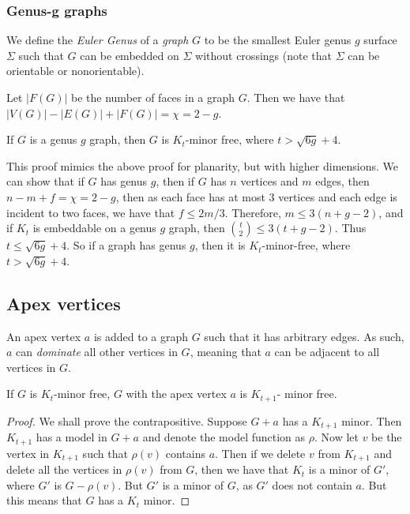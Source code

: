 \subsubsection{Genus-g graphs}\label{sssec:Graph_genus}

We define the \textit{Euler Genus} of a \textit{graph} $G$ to be the smallest Euler genus $g$ surface $\Sigma$ such that $G$ can be embedded on $\Sigma$ without crossings (note that $\Sigma$ can be orientable or nonorientable).

Let $|F(G)|$ be the number of faces in a graph $G$. Then we have that $|V(G)| - |E(G)| + |F(G)| = \chi = 2 - g$. 

\begin{theorem}\label{thm:bounded_genus_kt_free}
	If $G$ is a genus $g$ graph, then $G$ is $K_t$-minor free, where $t > \sqrt{6g} + 4$. 
\end{theorem}
This proof mimics the above proof for planarity, but with higher dimensions. 
We can show that if $G$ has genus $g$, then if $G$ has $n$ vertices and $m$ edges, then $n - m + f = \chi = 2-g$, then as each face has at most 3 vertices and each edge is incident to two faces, we have that $f \leq 2m/3$. Therefore, $m \leq 3(n + g - 2)$, and if $K_t$ is embeddable on a genus $g$ graph, then $\binom{t}{2} \leq 3 (t + g - 2)$. Thus $t \leq \sqrt{6g} + 4$. So if a graph has genus $g$, then it is $K_t$-minor-free, where $t > \sqrt{6g} + 4$. 

\subsection{Apex vertices}\label{sssec:Apex_Vertices}
An apex vertex $a$ is added to a graph $G$ such that it has arbitrary edges. As such, $a$ can \textit{dominate} all other vertices in $G$, meaning that $a$ can be adjacent to all vertices in $G$. 
\begin{theorem}
	If $G$ is $K_t$-minor free, $G$ with the apex vertex $a$ is $K_{t+1}$- minor free. 
\end{theorem}
\begin{proof}
	We shall prove the contrapositive. Suppose $G + a$ has a $K_{t + 1}$ minor. Then $K_{t + 1}$ has a model in $G + a$ and denote the model function as $\rho$. Now let $v$ be the vertex in $K_{t + 1}$ such that $\rho(v)$ contains $a$. Then if we delete $v$ from $K_{t + 1}$ and delete all the vertices in $\rho(v)$ from $G$, then we have that $K_t$ is a minor of $G'$, where $G'$ is $G - \rho(v)$. But $G'$ is a minor of $G$, as $G'$ does not contain $a$. But this means that $G$ has a $K_t$ minor. 
\end{proof}

